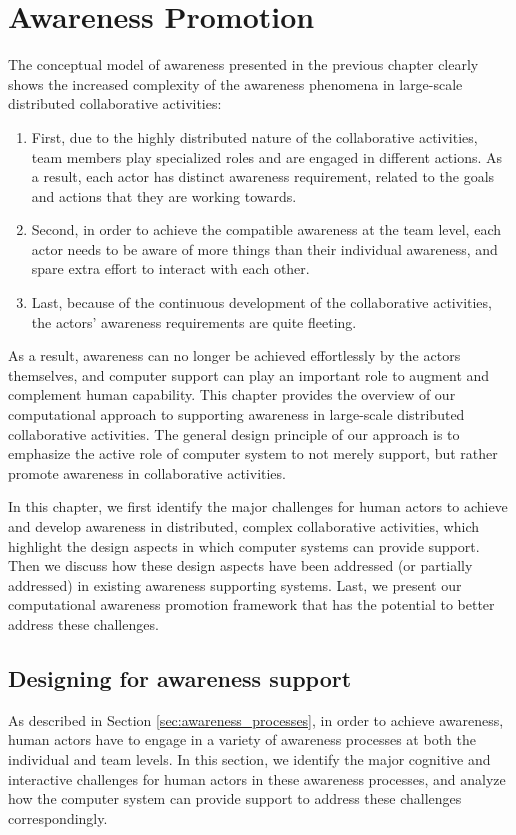 \graphicspath{{Figures/}}

\chapter{Awareness Promotion} %
\label{cha:awareness_promotion}
The conceptual model of awareness presented in the previous chapter clearly shows the increased complexity of the awareness phenomena in large-scale distributed collaborative activities:

\begin{enumerate}
   \item First, due to the highly distributed nature of the collaborative activities, team members play specialized roles and are engaged in different actions. As a result, each actor has distinct awareness requirement, related to the goals and actions that they are working towards.
   \item Second, in order to achieve the compatible awareness at the team level, each actor needs to be aware of more things than their individual awareness, and spare extra effort to interact with each other.
   \item Last, because of the continuous development of the collaborative activities, the actors' awareness requirements are quite fleeting.
\end{enumerate}

As a result, awareness can no longer be achieved effortlessly by the actors themselves, and computer support can play an important role to augment and complement human capability. This chapter provides the overview of our computational approach to supporting awareness in large-scale distributed collaborative activities. The general design principle of our approach is to emphasize the active role of computer system to not merely support, but rather promote awareness in collaborative activities.

In this chapter, we first identify the major challenges for human actors to achieve and develop awareness in distributed, complex collaborative activities, which highlight the design aspects in which computer systems can provide support. Then we discuss how these design aspects have been addressed (or partially addressed) in existing awareness supporting systems. Last, we present our computational awareness promotion framework that has the potential to better address these challenges.

\section{Designing for awareness support} %
\label{sec:designing_for_awareness_support}
As described in Section \ref{sec:awareness_processes}, in order to achieve awareness, human actors have to engage in a variety of awareness processes at both the individual and team levels. In this section, we identify the major cognitive and interactive challenges for human actors in these awareness processes, and analyze how the computer system can provide support to address these challenges correspondingly.

